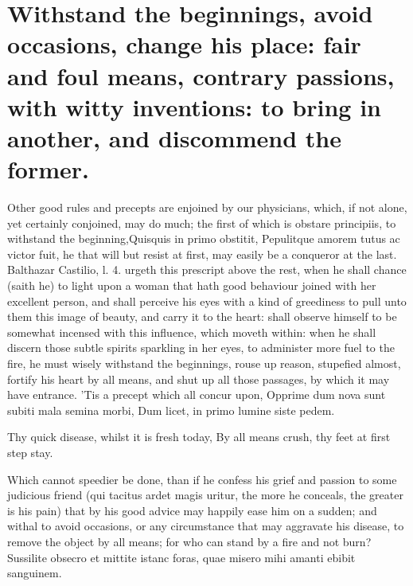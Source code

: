 {%
\section[Withstand the beginnings, avoid occasions of love]{Withstand the beginnings, avoid occasions, change his place: fair and foul means, contrary passions, with witty inventions: to bring in another, and discommend the former.}

Other good rules and precepts are enjoined by our physicians, which, if
not alone, yet certainly conjoined, may do much; the first of which is
obstare principiis, to withstand the beginning,Quisquis in primo
obstitit, Pepulitque amorem tutus ac victor fuit, he that will but
resist at first, may easily be a conqueror at the last. Balthazar
Castilio, l. 4. urgeth this prescript above the rest, when he
shall chance (saith he) to light upon a woman that hath good behaviour
joined with her excellent person, and shall perceive his eyes with a
kind of greediness to pull unto them this image of beauty, and carry it
to the heart: shall observe himself to be somewhat incensed with this
influence, which moveth within: when he shall discern those subtle
spirits sparkling in her eyes, to administer more fuel to the fire, he
must wisely withstand the beginnings, rouse up reason, stupefied
almost, fortify his heart by all means, and shut up all those passages,
by which it may have entrance. 'Tis a precept which all concur upon,
Opprime dum nova sunt subiti mala semina morbi,
Dum licet, in primo lumine siste pedem.

Thy quick disease, whilst it is fresh today,
By all means crush, thy feet at first step stay.

Which cannot speedier be done, than if he confess his grief and passion
to some judicious friend (qui tacitus ardet magis uritur, the
more he conceals, the greater is his pain) that by his good advice may
happily ease him on a sudden; and withal to avoid occasions, or any
circumstance that may aggravate his disease, to remove the object by
all means; for who can stand by a fire and not burn?
Sussilite obsecro et mittite istanc foras,
quae misero mihi amanti ebibit sanguinem.

}
